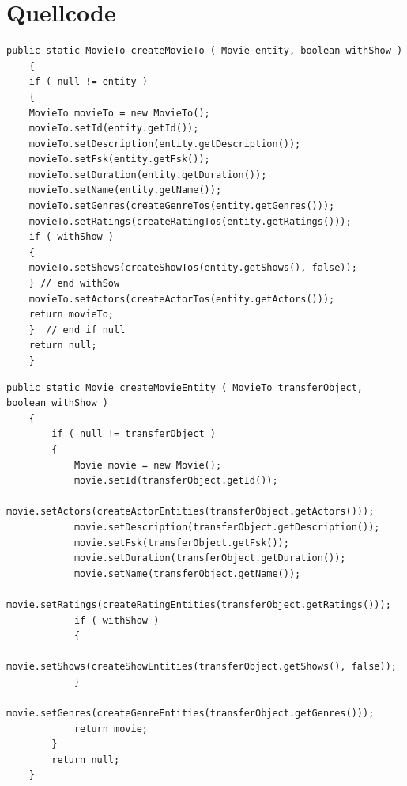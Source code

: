 \chapter{Quellcode}
\begin{minipage}{\linewidth}
	\begin{lstlisting}[style=lstJava]
	public static MovieTo createMovieTo ( Movie entity, boolean withShow )
	{
	if ( null != entity )
	{
	MovieTo movieTo = new MovieTo();
	movieTo.setId(entity.getId());
	movieTo.setDescription(entity.getDescription());
	movieTo.setFsk(entity.getFsk());
	movieTo.setDuration(entity.getDuration());
	movieTo.setName(entity.getName());
	movieTo.setGenres(createGenreTos(entity.getGenres()));
	movieTo.setRatings(createRatingTos(entity.getRatings()));
	if ( withShow )
	{
	movieTo.setShows(createShowTos(entity.getShows(), false));
	} // end withSow
	movieTo.setActors(createActorTos(entity.getActors()));
	return movieTo;
	}  // end if null
	return null;
	}
	\end{lstlisting}
	\label{lst:EntityToToHelper_movie}
\end{minipage}

\begin{minipage}{\linewidth}
	\begin{lstlisting}[style=lstJava]
	public static Movie createMovieEntity ( MovieTo transferObject, boolean withShow )
	{
		if ( null != transferObject )
		{
			Movie movie = new Movie();
			movie.setId(transferObject.getId());
			movie.setActors(createActorEntities(transferObject.getActors()));
			movie.setDescription(transferObject.getDescription());
			movie.setFsk(transferObject.getFsk());
			movie.setDuration(transferObject.getDuration());
			movie.setName(transferObject.getName());
			movie.setRatings(createRatingEntities(transferObject.getRatings()));
			if ( withShow )
			{
				movie.setShows(createShowEntities(transferObject.getShows(), false));
			}
			movie.setGenres(createGenreEntities(transferObject.getGenres()));
			return movie;
		}
		return null;
	}
	\end{lstlisting}
	\label{lst:ToToEntityHelper_movie}
\end{minipage}

